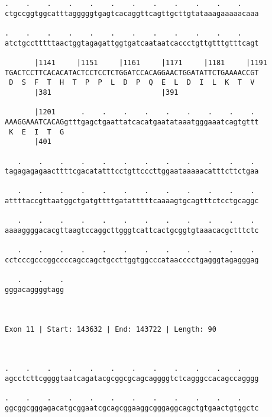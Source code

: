 \documentclass{article}
\begin{document}
\begin{Verbatim}
.    .    .    .    .    .    .    .    .    .    .    .    
ctgccggtggcatttagggggtgagtcacaggttcagttgcttgtataaagaaaaacaaa
                                                            
.    .    .    .    .    .    .    .    .    .    .    .    
atctgcctttttaactggtagagattggtgatcaataatcaccctgttgtttgtttcagt
                                                            
       |1141     |1151     |1161     |1171     |1181     |1191
TGACTCCTTCACACATACTCCTCCTCTGGATCCACAGGAACTGGATATTCTGAAAACCGT
 D  S  F  T  H  T  P  P  L  D  P  Q  E  L  D  I  L  K  T  V 
       |381                          |391                   
  
       |1201      .    .    .    .    .    .    .    .    . 
AAAGGAAATCACAGgtttgagctgaattatcacatgaatataaatgggaaatcagtgttt
 K  E  I  T  G                                              
       |401                                                 
  
   .    .    .    .    .    .    .    .    .    .    .    . 
tagagagagaacttttcgacatatttcctgttcccttggaataaaaacatttcttctgaa
                                                            
   .    .    .    .    .    .    .    .    .    .    .    . 
attttaccgttaatggctgatgttttgatatttttcaaaagtgcagtttctcctgcaggc
                                                            
   .    .    .    .    .    .    .    .    .    .    .    . 
aaaaggggacacgttaagtccaggcttgggtcattcactgcggtgtaaacacgctttctc
                                                            
   .    .    .    .    .    .    .    .    .    .    .    . 
cctcccgcccggccccagccagctgccttggtggcccataacccctgagggtagagggag
                                                            
   .    .    .
gggacaggggtagg
              
              
 
Exon 11 | Start: 143632 | End: 143722 | Length: 90



.    .    .    .    .    .    .    .    .    .    .    .    
agcctcttcggggtaatcagatacgcggcgcagcaggggtctcagggccacagccagggg
                                                            
.    .    .    .    .    .    .    .    .    .    .    .    
ggcggcgggagacatgcggaatcgcagcggaaggcgggaggcagctgtgaactgtggctc
                                                            

\end{Verbatim}
\end{document}
